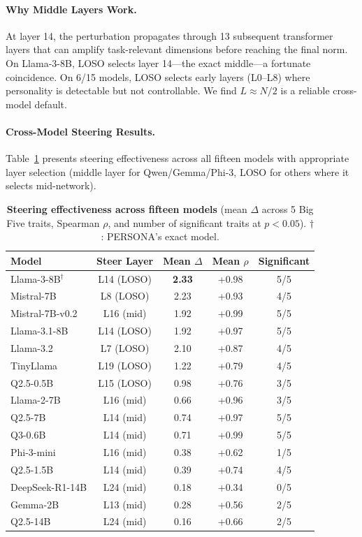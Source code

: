 \documentclass{article}
\begin{document}
\paragraph{Why Middle Layers Work.} At layer 14, the perturbation propagates through 13 subsequent transformer layers that can amplify task-relevant dimensions before reaching the final norm. On Llama-3-8B, LOSO selects layer 14---the exact middle---a fortunate coincidence. On 6/15 models, LOSO selects early layers (L0--L8) where personality is detectable but not controllable. We find $L \approx N/2$ is a reliable cross-model default.

\paragraph{Cross-Model Steering Results.} Table~\ref{tab:steering_summary} presents steering effectiveness across all fifteen models with appropriate layer selection (middle layer for Qwen/Gemma/Phi-3, LOSO for others where it selects mid-network).

\begin{table}[t]
\caption{\textbf{Steering effectiveness across fifteen models} (mean $\Delta$ across 5 Big Five traits, Spearman $\rho$, and number of significant traits at $p{<}0.05$). $\dagger$: PERSONA's exact model.}
\label{tab:steering_summary}
\centering
\small
\begin{tabular}{lcccc}
\toprule
\textbf{Model} & \textbf{Steer Layer} & \textbf{Mean $\Delta$} & \textbf{Mean $\rho$} & \textbf{Significant} \\
\midrule
Llama-3-8B$^\dagger$ & L14 (LOSO) & \textbf{2.33} & +0.98 & 5/5 \\
Mistral-7B & L8 (LOSO) & 2.23 & +0.93 & 4/5 \\
Mistral-7B-v0.2 & L16 (mid) & 1.92 & +0.99 & 5/5 \\
Llama-3.1-8B & L14 (LOSO) & 1.92 & +0.97 & 5/5 \\
Llama-3.2 & L7 (LOSO) & 2.10 & +0.87 & 4/5 \\
\midrule
TinyLlama & L19 (LOSO) & 1.22 & +0.79 & 4/5 \\
Q2.5-0.5B & L15 (LOSO) & 0.98 & +0.76 & 3/5 \\
Llama-2-7B & L16 (mid) & 0.66 & +0.96 & 3/5 \\
Q2.5-7B & L14 (mid) & 0.74 & +0.97 & 5/5 \\
Q3-0.6B & L14 (mid) & 0.71 & +0.99 & 5/5 \\
\midrule
Phi-3-mini & L16 (mid) & 0.38 & +0.62 & 1/5 \\
Q2.5-1.5B & L14 (mid) & 0.39 & +0.74 & 4/5 \\
DeepSeek-R1-14B & L24 (mid) & 0.18 & +0.34 & 0/5 \\
Gemma-2B & L13 (mid) & 0.28 & +0.56 & 2/5 \\
Q2.5-14B & L24 (mid) & 0.16 & +0.66 & 2/5 \\
\bottomrule
\end{tabular}
\end{table}
\end{document}
